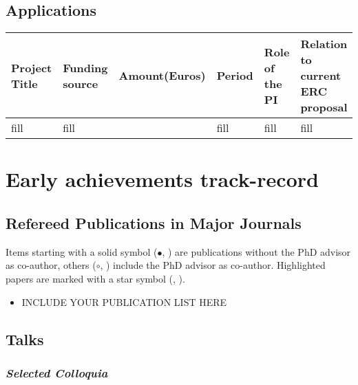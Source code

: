 \documentclass[STG]{ercgrant}
\begin{document}
\subsection{Applications}
\color{red}
\begin{footnotesize}
	\def\arraystretch{1.5}
	\begin{tabular}{|p{3.9cm}|p{2.5cm}|p{1.4cm}|p{}|p{1.6cm}|p{1.8cm}|}
		\hline
		\rowcolor{black!20}
		\textbf{Project Title}         &
		\textbf{Funding source}        &
		\textbf{Amount\newline(Euros)} &
		\textbf{Period}                &
		\textbf{Role of the PI}        &
		\textbf{Relation to \newline current ERC \newline proposal}          \\
		\hline
		fill                           & fill & \EUR{1} & fill & fill & fill \\
		\hline
	\end{tabular}
\end{footnotesize}
\color{black}

\newpage
\section{Early achievements track-record}

\subsection{Refereed Publications in Major Journals}
\color{red}
Items starting with a solid symbol ($\bullet$, \fstar) are publications without the PhD advisor as
co-author, others ($\circ$, \ostar) include the PhD advisor as co-author. Highlighted papers are
marked with a star symbol (\ostar, \fstar).\\
\color{black}

\color{red}
\begin{itemize}[topsep=0pt,itemsep=0.62ex,partopsep=0ex,parsep=0.5ex]
	\item INCLUDE YOUR PUBLICATION LIST HERE
\end{itemize}
\color{black}

\subsection{Talks}
\subsubsection{\textit{Selected Colloquia}}
\end{document}
